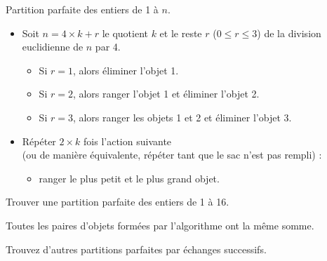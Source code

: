 \documentclass[11pt]{article}
\begin{document}
  \begin{algorithme}{Partition parfaite des entiers de 1 à $n$.}
    \begin{itemize}
    \item Soit $n = 4 \times k + r$ le quotient $k$ et le reste $r$ ($0 \leq r \leq 3$) de la division euclidienne de $n$ par 4.
      \begin{itemize}
      \item Si $r=1$, alors éliminer l'objet 1.
      \item Si $r=2$, alors ranger l'objet 1 et éliminer l'objet 2.
      \item Si $r=3$, alors ranger les objets 1 et 2 et éliminer l'objet 3.
      \end{itemize}
  \item Répéter $2 \times k$ fois l'action suivante \\ (ou de manière équivalente, répéter tant que le sac n'est pas rempli) :
    \begin{itemize}
    \item ranger le plus petit et le plus grand objet.
    \end{itemize}
  \end{itemize}
  \end{algorithme}

  \begin{exercice}[label=ex-16]{}
    Trouver une partition parfaite des entiers de 1 à 16.
  \end{exercice}


\begin{remarque}{}
  Toutes les paires d'objets formées par l'algorithme ont la même somme.
\end{remarque}


\begin{exercice}{}
  Trouvez d'autres partitions parfaites par échanges successifs.
\end{exercice}
\end{document}
